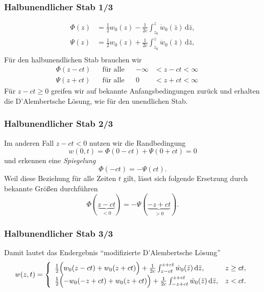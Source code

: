\begin{frame}
\hspace{1cm} \frametitle{Halbunendlicher Stab 1/3}

\begin{align*}
 \Phi(z)&=\frac{1}{2}w_0(z)-\frac{1}{2c} \int_{z_0}^z  \dot{w}_0(\bar{z})\,\mathrm{d}\bar{z},\\
 \Psi(z)&=\frac{1}{2}w_0(z)+\frac{1}{2c} \int_{z_0}^z  \dot{w}_0(\bar{z})\,\mathrm{d}\bar{z},\\
\end{align*}
Für den halbunendlichen Stab brauchen wir
\begin{align*}
 \Phi(z-ct) & &\text{für alle}& &-\infty &< z-ct < \infty & &\\ %
 \Psi(z+ct) & &\text{für alle}& & 0 &< z+ct < \infty & &%
\end{align*}
Für $z-ct\ge 0$ greifen wir auf bekannte Anfangsbedingungen zurück und erhalten die D'Alembertsche Lösung, wie für den unendlichen Stab.
\end{frame} 

\begin{frame}
\frametitle{Halbunendlicher Stab 2/3}
Im anderen Fall $z-ct<0$ nutzen wir die Randbedingung 
\begin{equation*}
 w(0,t)=\Phi(0-ct)+\Psi(0+ct)=0
\end{equation*}
und erkennen eine \textsl{Spiegelung}
\begin{equation*}
 \Phi(-ct)=-\Psi(ct).
\end{equation*}
Weil diese Beziehung für alle Zeiten $t$ gilt, lässt sich folgende Ersetzung durch bekannte Größen durchführen
\begin{equation*}
\Phi(\underbrace{z-ct}_{<0})=-\Psi(\underbrace{-z+ct}_ {>0}). 
\end{equation*}
\end{frame}

\begin{frame}
\frametitle{Halbunendlicher Stab 3/3}
Damit lautet das Endergebnis ``modifizierte D'Alembertsche Lösung''
\begin{equation*}
 w(z,t)=\left\{ \begin{array}{ll}
                 \frac{1}{2}\Bigl( w_0(z-ct) + w_0(z+ct) \Bigr)+\frac{1}{2c} \int_{z-ct}^{z+ct}  \dot{w}_0(\bar{z})\,\mathrm{d}\bar{z}, & z \ge ct, \\
                 \frac{1}{2}\Bigl( -w_0(-z+ct) + w_0(z+ct) \Bigr)+\frac{1}{2c} \int_{-z+ct}^{z+ct}  \dot{w}_0(\bar{z})\,\mathrm{d}\bar{z}, & z < ct. 
                \end{array}
  \right.
\end{equation*}

\end{frame}

